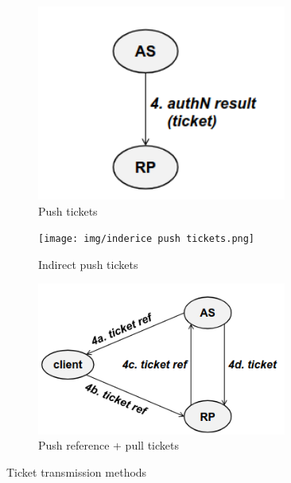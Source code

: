 \begin{figure}[H]
  \centering
  \begin{subfigure}{.3\textwidth}
    \centering
    \includegraphics[width=0.9\textwidth]{img/push tickets.png}
    \caption{Push tickets}
  \end{subfigure}
  \begin{subfigure}{.3\textwidth}
    \centering
    \texttt{[image: img/inderice push
    tickets.png]}
    \caption{Indirect push tickets}
  \end{subfigure}
  \begin{subfigure}{.3\textwidth}
    \centering
    \includegraphics[width=0.9\textwidth]{img/pull ticket.png}
    \caption{Push reference + pull tickets}
  \end{subfigure}
  \caption{Ticket transmission methods}
\end{figure}

